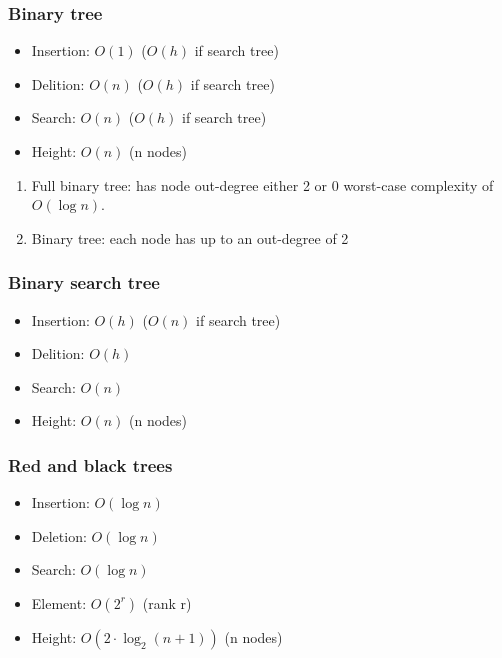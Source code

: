 \newpage
\begin{multicols}{2}
\subsubsection{Binary tree}
\begin{itemize}
  \item Insertion: $O(1)$  ($O(h)$ if search tree)
  \item Delition: $O(n)$   ($O(h)$ if search tree)
  \item Search: $O(n)$  ($O(h)$ if search tree)
  \item Height: $O(n)$ (n nodes)
\end{itemize}

\begin{enumerate}
\item  Full binary tree: has node out-degree either 2 or 0
  worst-case complexity of $O(\log{n})$.
\item  Binary tree: each node has up to an out-degree of 2
\end{enumerate}

\subsubsection{Binary search tree}
\begin{itemize}
  \item Insertion: $O(h)$  ($O(n)$ if search tree)
  \item Delition: $O(h)$
  \item Search: $O(n)$
  \item Height: $O(n)$ (n nodes)
\end{itemize}


\subsubsection{Red and black trees}
\begin{itemize}
  \item Insertion: $O(\log{n})$ %
  \item Deletion: $O(\log{n})$
  \item Search: $O(\log{n})$ %
  \item Element: $O(2^r)$  (rank r) %
  \item Height: $O(2\cdot\log_{2}(n+1))$ (n nodes)
\end{itemize}


\end{multicols}
